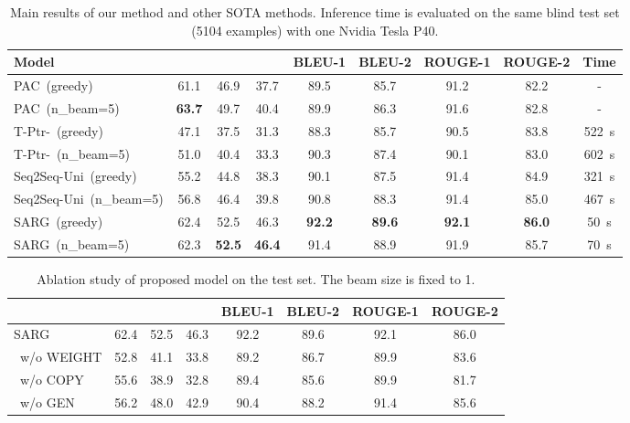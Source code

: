 \begin{table*}[!htb]
	\centering
	
	\begin{tabular}{|l|ccc|cccc|c|}
		\hline
		Model &  &  &  & BLEU-1 & BLEU-2 & ROUGE-1 & ROUGE-2   & Time \\ \hline
		PAC\ (greedy) & 61.1 & 46.9 & 37.7 & 89.5 & 85.7 & 91.2 & 82.2 &-\\
		PAC\ (n\_beam=5) & \textbf{63.7} & 49.7 & 40.4 & 89.9 & 86.3 & 91.6 & 82.8   & - \\ \hline
		T-Ptr-\ (greedy) & 47.1 & 37.5 & 31.3  & 88.3 & 85.7 & 90.5 & 83.8 & 522\ s \\ 
		T-Ptr-\ (n\_beam=5) & 51.0 & 40.4 & 33.3  & 90.3 & 87.4 & 90.1 & 83.0 & 602\ s \\ \hline
		Seq2Seq-Uni\ (greedy)  & 55.2 & 44.8 & 38.3 & 90.1 & 87.5 & 91.4 & 84.9 & 321\ s \\ 
		Seq2Seq-Uni\ (n\_beam=5)  & 56.8 & 46.4 & 39.8  & 90.8 & 88.3 & 91.4 & 85.0 & 467\ s \\ \hline
		SARG\ (greedy) & 62.4 & 52.5 & 46.3  & \textbf{92.2} & \textbf{89.6} & \textbf{92.1} & \textbf{86.0} & 50\ s \\ 
		SARG\ (n\_beam=5) & 62.3 & \textbf{52.5} & \textbf{46.4} & 91.4 & 88.9 & 91.9 & 85.7 & 70\ s \\ \hline
	\end{tabular}
	\caption{Main results of our method and other SOTA methods. Inference time is evaluated on the same blind test set (5104 examples) with one Nvidia Tesla P40.}\label{mainrlt}
\end{table*}

\begin{table*}[!htb]
	\centering
	\begin{tabular}{|l|ccc|cccc|}
		\hline
		&  &  &   & BLEU-1 & BLEU-2 & ROUGE-1 & ROUGE-2\\ \hline
		SARG  & 62.4 & 52.5 & 46.3  & 92.2 & 89.6 & 92.1 & 86.0 \\ \hline
		\ w/o WEIGHT  & 52.8 & 41.1 & 33.8 & 89.2 & 86.7 & 89.9 & 83.6 \\ \hline
		\ w/o COPY  & 55.6 & 38.9 & 32.8 & 89.4 & 85.6 & 89.9 & 81.7 \\ \hline
		\ w/o GEN & 56.2 & 48.0 & 42.9 & 90.4 & 88.2 & 91.4 & 85.6 \\ \hline
	\end{tabular}
	\caption{Ablation study of proposed model on the test set. The beam size is fixed to 1.}\label{ablation}
\end{table*}


